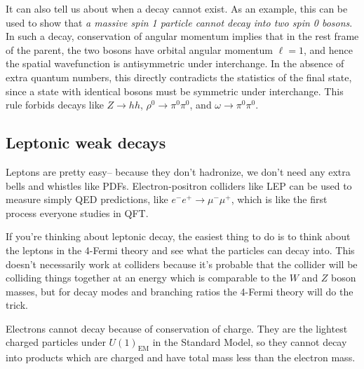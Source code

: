 \documentclass[11pt, oneside]{article}   	%
\theoremstyle{definition}
\numberwithin{equation}{subsection}		%
\newenvironment{answer}{\begin{center}\begin{answerbox}}{\end{answerbox}\end{center}}
\begin{document}
\begin{answer}
\begin{flushleft}
	It can also tell us about when a decay cannot exist. As an example, this can be used to show that \textit{a massive spin 1 particle 
	cannot decay into two spin 0 bosons}. In such a decay, conservation of angular momentum implies that in the rest frame of the 
	parent, the two bosons have orbital angular momentum $\ell = 1$, and hence the spatial wavefunction is antisymmetric under interchange. 
	In the absence of extra quantum numbers, this directly contradicts the statistics of the final state, since a state with identical bosons must 
	be symmetric under interchange. This rule forbids decays like $Z\rightarrow hh$, $\rho^0\rightarrow \pi^0 \pi^0$, and $\omega\rightarrow 
	\pi^0\pi^0$. 
	\end{flushleft}
\end{answer}

\subsection{Leptonic weak decays}
\label{sec:weak_decay_approximations}

Leptons are pretty easy-- because they don't hadronize, we don't need any extra bells and whistles like PDFs. Electron-positron colliders like 
LEP can be used to measure simply QED predictions, like $e^- e^+\rightarrow \mu^-\mu^+$, which is like the first process everyone studies 
in QFT. 

If you're thinking about leptonic decay, the easiest thing to do is to think about the leptons in the 4-Fermi theory and see what the 
particles can decay into. This doesn't necessarily work at colliders because it's probable that the collider will be colliding things together at 
an energy which is comparable to the $W$ and $Z$ boson masses, but for decay modes and branching ratios the 4-Fermi theory will do 
the trick. 

Electrons cannot decay because of conservation of charge. They are the lightest charged particles under $U(1)_\mathrm{EM}$ in the 
Standard Model, so they cannot decay into products which are charged and have total mass less than the electron mass. 
\end{document}

